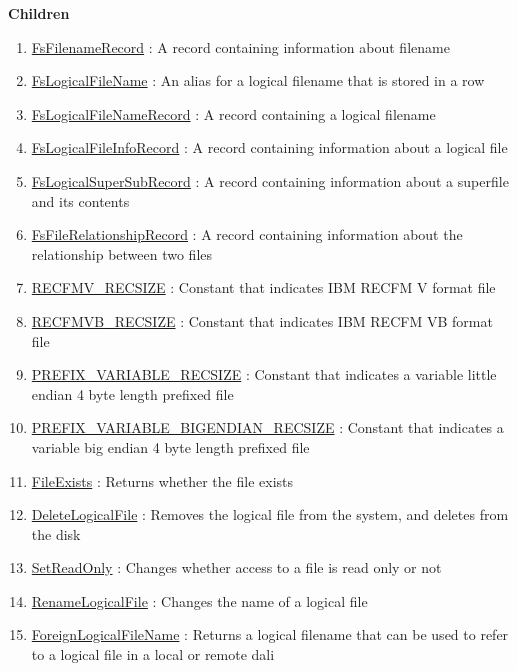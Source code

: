 \textbf{Children}
\begin{enumerate}
\item \hyperlink{ecldoc:file.fsfilenamerecord}{FsFilenameRecord}
: A record containing information about filename
\item \hyperlink{ecldoc:file.fslogicalfilename}{FsLogicalFileName}
: An alias for a logical filename that is stored in a row
\item \hyperlink{ecldoc:file.fslogicalfilenamerecord}{FsLogicalFileNameRecord}
: A record containing a logical filename
\item \hyperlink{ecldoc:file.fslogicalfileinforecord}{FsLogicalFileInfoRecord}
: A record containing information about a logical file
\item \hyperlink{ecldoc:file.fslogicalsupersubrecord}{FsLogicalSuperSubRecord}
: A record containing information about a superfile and its contents
\item \hyperlink{ecldoc:file.fsfilerelationshiprecord}{FsFileRelationshipRecord}
: A record containing information about the relationship between two files
\item \hyperlink{ecldoc:file.recfmv_recsize}{RECFMV\_RECSIZE}
: Constant that indicates IBM RECFM V format file
\item \hyperlink{ecldoc:file.recfmvb_recsize}{RECFMVB\_RECSIZE}
: Constant that indicates IBM RECFM VB format file
\item \hyperlink{ecldoc:file.prefix_variable_recsize}{PREFIX\_VARIABLE\_RECSIZE}
: Constant that indicates a variable little endian 4 byte length prefixed file
\item \hyperlink{ecldoc:file.prefix_variable_bigendian_recsize}{PREFIX\_VARIABLE\_BIGENDIAN\_RECSIZE}
: Constant that indicates a variable big endian 4 byte length prefixed file
\item \hyperlink{ecldoc:file.fileexists}{FileExists}
: Returns whether the file exists
\item \hyperlink{ecldoc:file.deletelogicalfile}{DeleteLogicalFile}
: Removes the logical file from the system, and deletes from the disk
\item \hyperlink{ecldoc:file.setreadonly}{SetReadOnly}
: Changes whether access to a file is read only or not
\item \hyperlink{ecldoc:file.renamelogicalfile}{RenameLogicalFile}
: Changes the name of a logical file
\item \hyperlink{ecldoc:file.foreignlogicalfilename}{ForeignLogicalFileName}
: Returns a logical filename that can be used to refer to a logical file in a local or remote dali

\end{enumerate}
